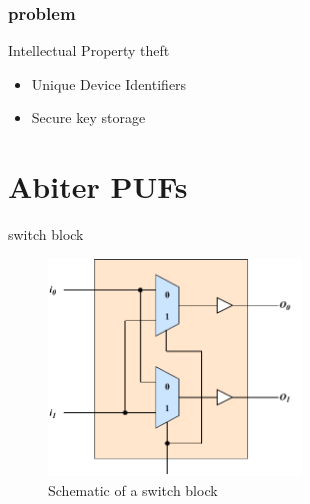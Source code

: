 \documentclass[10pt, compress]{beamer}
\title{}
\subtitle{On Statistical Properties of\\Arbiter Physical Unclonable Function}
\date{\today}
\author{Phillip Gajland}
\institute{KTH Royal Institute of Technology}
\begin{document}
\maketitle

\begin{frame}[fragile]
  \frametitle{problem}

  Intellectual Property theft 
  
  \begin{itemize}
      \item Unique Device Identifiers
      \item Secure key storage
  \end{itemize}
\end{frame}

\section{Abiter PUFs}

\begin{frame}{switch block}
    \begin{figure}
        \centering
        \includegraphics[width=0.6\textwidth]{figures/switch_block_detailed.pdf}
        \caption{Schematic of a switch block}
    \end{figure}
\end{frame}
\end{document}
